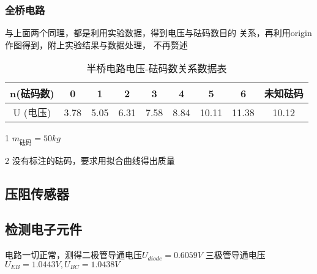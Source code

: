 \documentclass[a4paper,UTF8]{ctexart}
\begin{document}
\subsubsection*{全桥电路}
与上面两个同理，都是利用实验数据，得到电压与砝码数目的
关系，再利用origin作图得到，附上实验结果与数据处理，
不再赘述
\begin{table}[!hp]
    \begin{center}
        \begin{threeparttable}
            \caption{半桥电路电压-砝码数关系数据表}
            \begin{tabular}{|c|c|c|c|c|c|c|c|c|}
                \hline
                n\tnote{1}(砝码数) & 0 & 1 & 2 & 3 & 4 & 5 & 6 & 未知砝码\tnote{2}\\
                \hline
                U (电压) & 3.78 & 5.05 & 6.31 & 7.58 & 8.84 & 10.11 & 11.38 & 10.12\\
                \hline
            \end{tabular}
            \label{table:3}
            \begin{tablenotes}
                \footnotesize
                \item[1] $m_{砝码}=50kg$
                \item[2] 没有标注的砝码，要求用拟合曲线得出质量
            \end{tablenotes}
        \end{threeparttable}
    \end{center}
\end{table}

{\centering\subsection*{压阻传感器}}

\subsection*{检测电子元件}
    电路一切正常，测得二极管导通电压$U_{diode}=0.6059V$
三极管导通电压$U_{EB}=1.0443V,U_{BC}=1.0438V$
\end{document}
